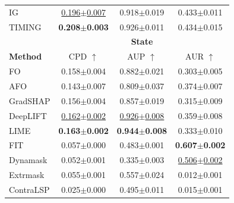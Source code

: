 \documentclass[11pt]{article}
\theoremstyle{plain}
\theoremstyle{definition}
\theoremstyle{remark}
\begin{document}
\begin{table}[h!]
\begin{tabular}{l|ccc}
    \midrule
    
    IG        & 
    \underline{0.196\scriptsize{$\pm$0.007}} & 0.918\scriptsize{$\pm$0.019} & 0.433\scriptsize{$\pm$0.011}  \\
    
    \rowcolor{gray!20} TIMING & \textbf{0.208\scriptsize{$\pm$0.003}} & 0.926\scriptsize{$\pm$0.011} & 0.434\scriptsize{$\pm$0.015} \\
    
    \midrule \midrule
    
    {} 
    & \multicolumn{3}{c}{\textbf{State}}  \\
    \textbf{Method} &
    CPD $\uparrow$ & AUP $\uparrow$ & AUR $\uparrow$ \\
    
    \midrule
    
    FO        & 0.158\scriptsize{$\pm$0.004} & 0.882\scriptsize{$\pm$0.021} & 0.303\scriptsize{$\pm$0.005} \\
    
    AFO       & 0.143\scriptsize{$\pm$0.007} & 0.809\scriptsize{$\pm$0.037} & 0.374\scriptsize{$\pm$0.007} \\
    
    GradSHAP  & 0.156\scriptsize{$\pm$0.004} & 0.857\scriptsize{$\pm$0.019} & 0.315\scriptsize{$\pm$0.009} \\
    
    DeepLIFT  & \underline{0.162\scriptsize{$\pm$0.002}} & \underline{0.926\scriptsize{$\pm$0.008}} & 0.359\scriptsize{$\pm$0.008} \\
    
    LIME      & \textbf{0.163\scriptsize{$\pm$0.002}} & \textbf{0.944\scriptsize{$\pm$0.008}} & 0.333\scriptsize{$\pm$0.010} \\
    
    FIT       & 0.057\scriptsize{$\pm$0.000} & 0.483\scriptsize{$\pm$0.001} & \textbf{0.607\scriptsize{$\pm$0.002}} \\
    
    Dynamask  & 0.052\scriptsize{$\pm$0.001} & 0.335\scriptsize{$\pm$0.003} & \underline{0.506\scriptsize{$\pm$0.002}}  \\
    
    Extrmask  & 0.055\scriptsize{$\pm$0.001} & 0.557\scriptsize{$\pm$0.024} & 0.012\scriptsize{$\pm$0.001}  \\
    
    ContraLSP & 0.025\scriptsize{$\pm$0.000} & 0.495\scriptsize{$\pm$0.011} & 0.015\scriptsize{$\pm$0.001}  \\
    

\end{tabular}
\end{table}
\end{document}
